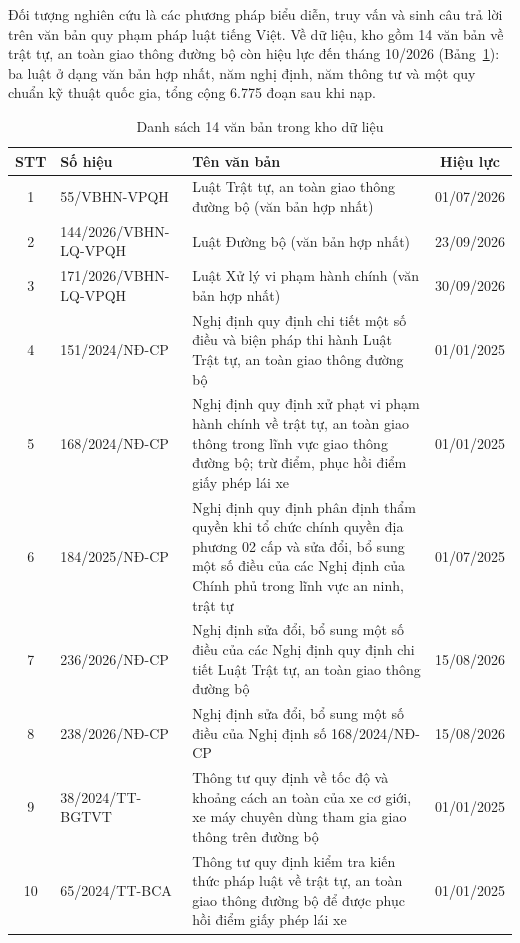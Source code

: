 Đối tượng nghiên cứu là các phương pháp biểu diễn, truy vấn và sinh câu trả lời trên văn bản quy phạm pháp luật tiếng Việt. Về dữ liệu, kho gồm 14 văn bản về trật tự, an toàn giao thông đường bộ còn hiệu lực đến tháng 10/2026 (Bảng~\ref{tab:c1_kho_van_ban}): ba luật ở dạng văn bản hợp nhất, năm nghị định, năm thông tư và một quy chuẩn kỹ thuật quốc gia, tổng cộng 6.775 đoạn sau khi nạp.

\begin{table}[H]
\centering
\caption{Danh sách 14 văn bản trong kho dữ liệu}
\label{tab:c1_kho_van_ban}
\footnotesize
\renewcommand{\arraystretch}{1.05}
\begin{tabularx}{\textwidth}{@{}c l X c@{}}
\toprule
\textbf{STT} & \textbf{Số hiệu} & \textbf{Tên văn bản} & \textbf{Hiệu lực} \\
\midrule
1 & 55/VBHN-VPQH & Luật Trật tự, an toàn giao thông đường bộ (văn bản hợp nhất) & 01/07/2026 \\
2 & 144/2026/VBHN-LQ-VPQH & Luật Đường bộ (văn bản hợp nhất) & 23/09/2026 \\
3 & 171/2026/VBHN-LQ-VPQH & Luật Xử lý vi phạm hành chính (văn bản hợp nhất) & 30/09/2026 \\
4 & 151/2024/NĐ-CP & Nghị định quy định chi tiết một số điều và biện pháp thi hành Luật Trật tự, an toàn giao thông đường bộ & 01/01/2025 \\
5 & 168/2024/NĐ-CP & Nghị định quy định xử phạt vi phạm hành chính về trật tự, an toàn giao thông trong lĩnh vực giao thông đường bộ; trừ điểm, phục hồi điểm giấy phép lái xe & 01/01/2025 \\
6 & 184/2025/NĐ-CP & Nghị định quy định phân định thẩm quyền khi tổ chức chính quyền địa phương 02 cấp và sửa đổi, bổ sung một số điều của các Nghị định của Chính phủ trong lĩnh vực an ninh, trật tự & 01/07/2025 \\
7 & 236/2026/NĐ-CP & Nghị định sửa đổi, bổ sung một số điều của các Nghị định quy định chi tiết Luật Trật tự, an toàn giao thông đường bộ & 15/08/2026 \\
8 & 238/2026/NĐ-CP & Nghị định sửa đổi, bổ sung một số điều của Nghị định số 168/2024/NĐ-CP & 15/08/2026 \\
9 & 38/2024/TT-BGTVT & Thông tư quy định về tốc độ và khoảng cách an toàn của xe cơ giới, xe máy chuyên dùng tham gia giao thông trên đường bộ & 01/01/2025 \\
10 & 65/2024/TT-BCA & Thông tư quy định kiểm tra kiến thức pháp luật về trật tự, an toàn giao thông đường bộ để được phục hồi điểm giấy phép lái xe & 01/01/2025 \\

\end{tabularx}
\end{table}
